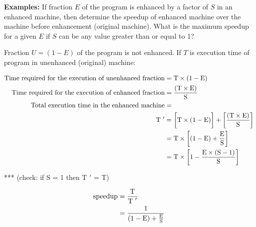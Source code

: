 \documentclass[11pt]{article}
\begin{document}
\noindent\textbf{Examples:} If fraction \(E\) of the program is enhanced by a factor of \(S\) in an enhanced machine, then determine the speedup of enhanced machine over the machine before enhancement (original machine). What is the maximum speedup for a given \(E\) if \(S\) can be any value greater than or equal to 1?

Fraction \(U = (1 - E) \) of the program is not enhanced. If \(T\) is execution time of program in unenhanced (original) machine:

\begin{align}
    \text{Time required for the execution of unenhanced fraction} &= \text{T} \times (1 - \text{E})\\
    \text{Time required for the execution of enhanced fraction} &= \frac{(\text{T} \times \text{E})}{\text{S}}\\
    \notag\text{Total execution time in the enhanced machine} &= \\
    \notag\text{T }' &= \bigg[\text{T} \times (1 - \text{E})\bigg] + \bigg[\frac{(\text{T} \times \text{E})}{\text{S}}\bigg]\\
    &= \text{T} \times \bigg[(1 - \text{E}) + \frac{\text{E}}{\text{S}}\bigg]\\
    \notag&= \text{T} \times \bigg[1 - \frac{\text{E}\times(\text{S}-1)}{\text{S}}\bigg]
\end{align}
\begin{center}
    *** (check: if S = 1 then T \('\) = T)
\end{center}
\begin{align}
    \notag\text{speedup} &= \frac{\text{T}}{\text{T }'}\\
    &= \frac{1}{(1 - \text{E}) + \frac{\text{E}}{\text{S}}}
\end{align}
\end{document}
